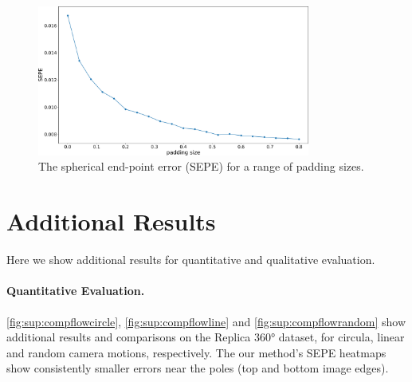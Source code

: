 \begin{figure}[hbt!]
	\centering
	\includegraphics[width=0.80\textwidth]{images/abla_padding.pdf}
	\caption{\label{fig:sup:ablationpadding}%
		The spherical end-point error (SEPE) for a range of padding sizes.}
\end{figure}


\section{Additional Results}

Here we show additional results for quantitative and qualitative evaluation.

\paragraph{Quantitative Evaluation.}

\cref{fig:sup:compflowcircle}, \cref{fig:sup:compflowline} and \cref{fig:sup:compflowrandom} show additional results and comparisons on the Replica 360° dataset, for circula, linear and random camera motions, respectively.
The our method's SEPE heatmaps show consistently smaller errors near the poles (top and bottom image edges).

